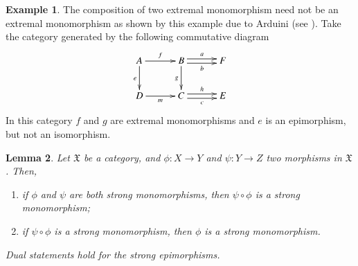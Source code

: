 \documentclass[12pt]{article}
\newtheorem{lemma}{Lemma}[section]
\theoremstyle{definition}
\newtheorem{example}[lemma]{Example}
\def\X{\mathfrak X}
\numberwithin{equation}{section}
\begin{document}
\begin{example}\label{composition:of:extremal:monomorphisms} 
	The  composition of two extremal monomorphism need not be an extremal monomorphism as shown by this example due to Arduini (see \cite[Appendix]{Arduini}). Take the category generated  by the following commutative diagram
	\[\xymatrix@C=30pt{
	A\ar@{>}[r]^f\ar@{>}[d]_e &B\ar@<-.5ex>[r]_b\ar@<.5ex>[r]^a \ar@{>}[d]_g &F\\
	D\ar@{>}[r]_m &C\ar@<-.5ex>[r]_c\ar@<.5ex>[r]^h  &E
}\]
	In this category $f$ and $g$ are extremal monomorphisms and $e$ is an epimorphism, but not an isomorphism.
\end{example}


\begin{lemma}\label{strong_prop_lemma}
Let $\X$ be a category, and $\phi\colon X\to Y$ and $\psi\colon Y\to Z$ two morphisms in $\X$. Then, 
\begin{enumerate}[\rm (1)]
\item if $\phi$ and  $\psi$ are both strong monomorphisms, then $\psi\circ \phi$  is a strong monomorphism;
\item if $\psi\circ \phi$ is a strong monomorphism, then $\phi$ is a strong monomorphism.
\end{enumerate}
Dual statements hold for the strong epimorphisms. 
\end{lemma}
\end{document}
